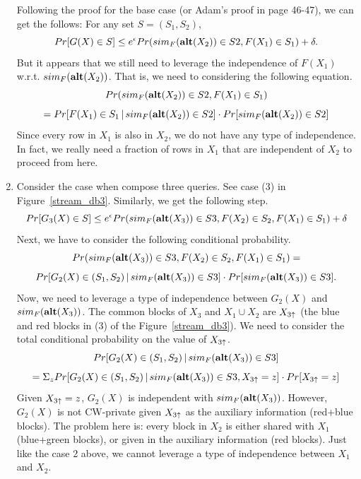 \documentclass[11pt]{article}
\begin{document}
\begin{enumerate}
Following the proof for the base case (or Adam's proof in page 46-47), we can get the follows: For any set $S=(S_{1}, S_{2})$,
\[
Pr [G(X) \in S] \leq e^{\epsilon}  Pr({sim_{F}({\bf alt}(X_{2})) \in S{2}}, { F(X_{1}) \in S_{1}})+\delta.
\]
But it appears that we still need to leverage the independence of $F(X_{1})$ w.r.t. $sim_{F}({\bf alt}(X_{2}))$. That is, we need to considering the following equation.
\[
Pr({sim_{F}({\bf alt}(X_{2})) \in S{2}}, { F(X_{1}) \in S_{1}}) 
\]
\[
= Pr[F(X_{1}) \in S_{1}\,|\,sim_{F}({\bf alt}(X_{2})) \in S{2}] \cdot Pr[sim_{F}({\bf alt}(X_{2})) \in S{2}]
\]
Since every row in $X_{1}$ is also in $X_{2}$, we do not have any type of independence. In fact, we really need a fraction of rows in $X_{1}$ that are independent of $X_{2}$ to proceed from here.
\item Consider the case when compose three queries. See case (3) in Figure~\ref{stream_db3}. Similarly, we get the following step.
\[
Pr [G_{3}(X) \in S] \leq e^{\epsilon}  Pr({sim_{F}({\bf alt}(X_{3})) \in S{3}}, { F(X_{2}) \in S_{2}}, { F(X_{1}) \in S_{1}})+\delta
\]
Next, we have to consider the following conditional probability.
\[
Pr({sim_{F}({\bf alt}(X_{3})) \in S{3}}, { F(X_{2}) \in S_{2}}, { F(X_{1}) \in S_{1}}) =
\]
\[
Pr[G_{2}(X) \in (S_{1}, S_{2})\,|\, sim_{F}({\bf alt}(X_{3})) \in S{3}] \cdot Pr[sim_{F}({\bf alt}(X_{3})) \in S{3}].
\]
Now, we need to leverage a type of independence between $G_{2}(X)$ and $sim_{F}({\bf alt}(X_{3}))$. The common blocks of $X_{3}$ and $X_{1} \cup X_{2}$ are $X_{3 \uparrow}$ (the blue and red blocks in (3) of the Figure~\ref{stream_db3}). We need to consider the total conditional probability on the value of $X_{3 \uparrow}$.
\[
Pr[G_{2}(X) \in (S_{1}, S_{2})\,|\, sim_{F}({\bf alt}(X_{3})) \in S{3}] 
\]
\[
=\Sigma_{z} Pr[G_{2}(X) \in (S_{1}, S_{2})\,|\, sim_{F}({\bf alt}(X_{3})) \in S{3}, X_{3 \uparrow}=z] \cdot Pr[ X_{3 \uparrow}=z] 
\]
Given $X_{3 \uparrow}=z$, $G_{2}(X)$ is independent with $sim_{F}({\bf alt}(X_{3}))$. However, $G_{2}(X)$ is not CW-private given $X_{3 \uparrow}$ as the auxiliary information (red+blue blocks). The problem here is: every block in $X_{2}$ is either shared with $X_{1}$ (blue+green blocks), or given in the auxiliary information (red blocks). Just like the case 2 above, we cannot leverage a type of independence between $X_{1}$ and $X_{2}$.
\end{enumerate}
\end{document}
